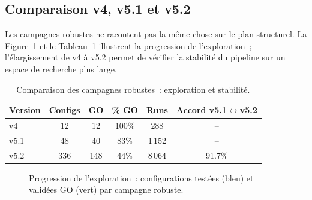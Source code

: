 \FloatBarrier
\subsection{Comparaison v4, v5.1 et v5.2}

Les campagnes robustes ne racontent pas la même chose sur le plan structurel. La
Figure~\ref{fig:go_comparison} et le Tableau~\ref{tab:versions_comparison} illustrent
la progression de l'exploration~; l'élargissement de v4 à v5.2 permet de vérifier la
stabilité du pipeline sur un espace de recherche plus large.

\begin{table}[H]
    \centering
    \caption{Comparaison des campagnes robustes~: exploration et stabilité.}
    \label{tab:versions_comparison}
    \begin{tabular}{lccccc}
        \toprule
        \textbf{Version} & \textbf{Configs} & \textbf{GO} & \textbf{\% GO}
            & \textbf{Runs} & \textbf{Accord v5.1$\leftrightarrow$v5.2} \\
        \midrule
        v4   & 12  & 12  & 100\% & 288     & -- \\
        v5.1 & 48  & 40  & 83\%  & 1\,152  & -- \\
        v5.2 & 336 & 148 & 44\%  & 8\,064  & 91.7\% \\
        \bottomrule
    \end{tabular}
\end{table}

\begin{figure}[H]
    \centering
    \caption{Progression de l'exploration~: configurations testées (bleu) et validées GO
    (vert) par campagne robuste.}
    \label{fig:go_comparison}
\end{figure}

